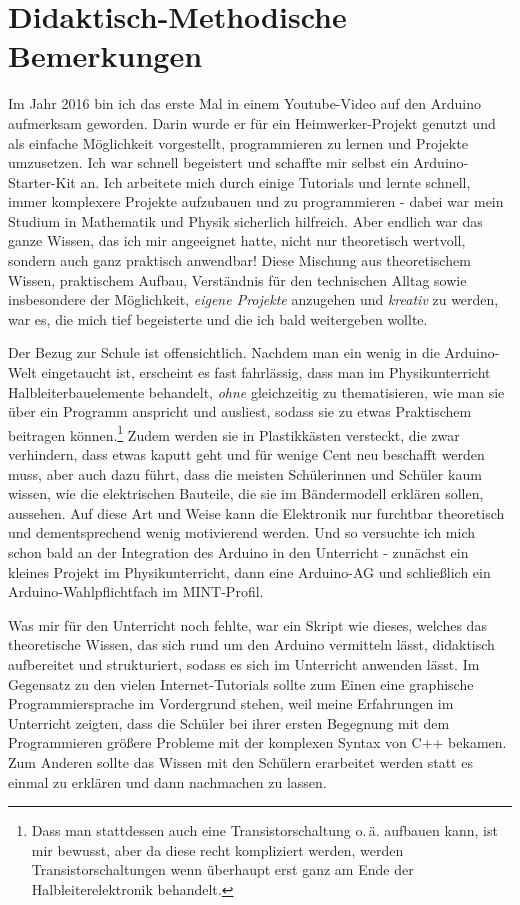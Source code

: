 \chapter{Didaktisch-Methodische Bemerkungen}\label{kap:didaktik}

Im Jahr 2016 bin ich das erste Mal in einem Youtube-Video auf den Arduino aufmerksam geworden. Darin wurde er für ein Heimwerker-Projekt genutzt und als einfache Möglichkeit vorgestellt, programmieren zu lernen und Projekte umzusetzen. Ich war schnell begeistert und schaffte mir selbst ein Arduino-Starter-Kit an. Ich arbeitete mich durch einige Tutorials und lernte schnell, immer komplexere Projekte aufzubauen und zu programmieren - dabei war mein Studium in Mathematik und Physik sicherlich hilfreich. Aber endlich war das ganze Wissen, das ich mir angeeignet hatte, nicht nur theoretisch wertvoll, sondern auch ganz praktisch anwendbar! Diese Mischung aus theoretischem Wissen, praktischem Aufbau, Verständnis für den technischen Alltag sowie insbesondere der Möglichkeit, \emph{eigene Projekte} anzugehen und \emph{kreativ} zu werden, war es, die mich tief begeisterte und die ich bald weitergeben wollte.

Der Bezug zur Schule ist offensichtlich. Nachdem man ein wenig in die Arduino-Welt eingetaucht ist, erscheint es fast fahrlässig, dass man im Physikunterricht Halbleiterbauelemente behandelt, \emph{ohne} gleichzeitig zu thematisieren, wie man sie über ein Programm anspricht und ausliest, sodass sie zu etwas Praktischem beitragen können.\footnote{Dass man stattdessen auch eine Transistorschaltung o.\,ä. aufbauen kann, ist mir bewusst, aber da diese recht kompliziert werden, werden Transistorschaltungen wenn überhaupt erst ganz am Ende der Halbleiterelektronik behandelt.} Zudem werden sie in Plastikkästen versteckt, die zwar verhindern, dass etwas kaputt geht und für wenige Cent neu beschafft werden muss, aber auch dazu führt, dass die meisten Schülerinnen und Schüler kaum wissen, wie die elektrischen Bauteile, die sie im Bändermodell erklären sollen, aussehen. Auf diese Art und Weise kann die Elektronik nur furchtbar theoretisch und dementsprechend wenig motivierend werden. Und so versuchte ich mich schon bald an der Integration des Arduino in den Unterricht - zunächst ein kleines Projekt im Physikunterricht, dann eine Arduino-AG und schließlich ein Arduino-Wahlpflichtfach im MINT-Profil.

Was mir für den Unterricht noch fehlte, war ein Skript wie dieses, welches das theoretische Wissen, das sich rund um den Arduino vermitteln lässt, didaktisch aufbereitet und strukturiert, sodass es sich im Unterricht anwenden lässt. Im Gegensatz zu den vielen Internet-Tutorials sollte zum Einen eine graphische Programmiersprache im Vordergrund stehen, weil meine Erfahrungen im Unterricht zeigten, dass die Schüler bei ihrer ersten Begegnung mit dem Programmieren größere Probleme mit der komplexen Syntax von C++ bekamen. Zum Anderen sollte das Wissen mit den Schülern erarbeitet werden statt es einmal zu erklären und dann nachmachen zu lassen.

